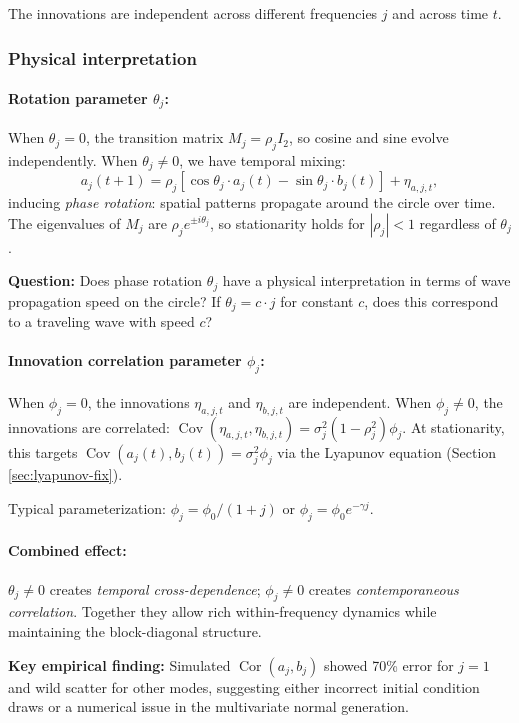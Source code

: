 \documentclass[answers,12pt,addpoints]{exam}
\begin{document}
The innovations are independent across different frequencies $j$ and across time $t$.

\subsubsection*{Physical interpretation}

\paragraph{Rotation parameter $\theta_j$:}
When $\theta_j = 0$, the transition matrix $M_j = \rho_j I_2$, so cosine and sine evolve independently. When $\theta_j \neq 0$, we have temporal mixing:
\[
  a_j(t+1) = \rho_j[\cos\theta_j \cdot a_j(t) - \sin\theta_j \cdot b_j(t)] + \eta_{a,j,t},
\]
inducing \emph{phase rotation}: spatial patterns propagate around the circle over time. The eigenvalues of $M_j$ are $\rho_j e^{\pm i\theta_j}$, so stationarity holds for $|\rho_j| < 1$ regardless of $\theta_j$.

{\color{blue}
\textbf{Question:} Does phase rotation $\theta_j$ have a physical interpretation in terms of wave propagation speed on the circle? If $\theta_j = c \cdot j$ for constant $c$, does this correspond to a traveling wave with speed $c$?
}

\paragraph{Innovation correlation parameter $\phi_j$:}
When $\phi_j = 0$, the innovations $\eta_{a,j,t}$ and $\eta_{b,j,t}$ are independent. When $\phi_j \neq 0$, the innovations are correlated: $\operatorname{Cov}(\eta_{a,j,t}, \eta_{b,j,t}) = \sigma_j^2(1-\rho_j^2)\phi_j$. {\color{blue}At stationarity, this targets $\operatorname{Cov}(a_j(t), b_j(t)) = \sigma_j^2 \phi_j$ via the Lyapunov equation (Section \ref{sec:lyapunov-fix}).}

Typical parameterization: $\phi_j = \phi_0 / (1 + j)$ or $\phi_j = \phi_0 e^{-\gamma j}$.

\paragraph{Combined effect:}
$\theta_j \neq 0$ creates \emph{temporal cross-dependence}; $\phi_j \neq 0$ creates \emph{contemporaneous correlation}. Together they allow rich within-frequency dynamics while maintaining the block-diagonal structure.

{\color{blue}
\textbf{Key empirical finding:} Simulated $\operatorname{Cor}(a_j, b_j)$ showed 70\% error for $j=1$ and wild scatter for other modes, suggesting either incorrect initial condition draws or a numerical issue in the multivariate normal generation.
}
\end{document}
